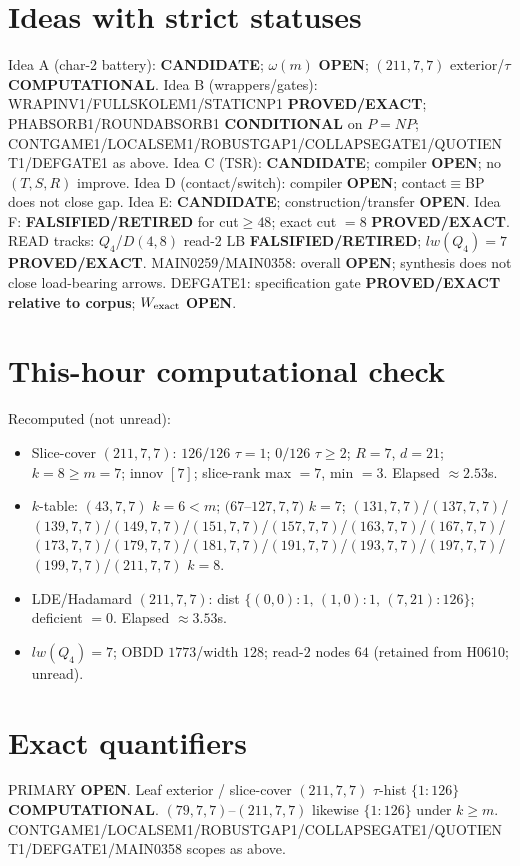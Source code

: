 \documentclass[11pt]{article}
\begin{document}
\section*{Ideas with strict statuses}
Idea A (char-2 battery): \textbf{CANDIDATE}; $\omega(m)$ \textbf{OPEN}; $(211,7,7)$ exterior/$\tau$ \textbf{COMPUTATIONAL}.
Idea B (wrappers/gates): WRAPINV1/FULLSKOLEM1/STATICNP1 \textbf{PROVED/EXACT};
PHABSORB1/ROUNDABSORB1 \textbf{CONDITIONAL} on $P=NP$;
CONTGAME1/LOCALSEM1/ROBUSTGAP1/COLLAPSEGATE1/QUOTIENT1/DEFGATE1 as above.
Idea C (TSR): \textbf{CANDIDATE}; compiler \textbf{OPEN}; no $(T,S,R)$ improve.
Idea D (contact/switch): compiler \textbf{OPEN}; contact$\equiv$BP does not close gap.
Idea E: \textbf{CANDIDATE}; construction/transfer \textbf{OPEN}.
Idea F: \textbf{FALSIFIED/RETIRED} for cut$\ge48$; exact cut $=8$ \textbf{PROVED/EXACT}.
READ tracks: $Q_4$/$D(4,8)$ read-$2$ LB \textbf{FALSIFIED/RETIRED}; $lw(Q_4)=7$ \textbf{PROVED/EXACT}.
MAIN0259/MAIN0358: overall \textbf{OPEN}; synthesis does not close load-bearing arrows.
DEFGATE1: specification gate \textbf{PROVED/EXACT relative to corpus}; $W_{\rm exact}$ \textbf{OPEN}.

\section*{This-hour computational check}
Recomputed (not unread):
\begin{itemize}
\item Slice-cover $(211,7,7)$: $126/126$ $\tau{=}1$; $0/126$ $\tau{\ge}2$; $R{=}7$, $d{=}21$;
  $k{=}8{\ge}m{=}7$; innov $[7]$; slice-rank max $=7$, min $=3$. Elapsed $\approx2.53$s.
\item $k$-table: $(43,7,7)$ $k{=}6{<}m$; $(67$--$127,7,7)$ $k{=}7$;
  $(131,7,7)$/$(137,7,7)$/$(139,7,7)$/$(149,7,7)$/$(151,7,7)$/$(157,7,7)$/$(163,7,7)$/$(167,7,7)$/$(173,7,7)$/$(179,7,7)$/$(181,7,7)$/$(191,7,7)$/$(193,7,7)$/$(197,7,7)$/$(199,7,7)$/$(211,7,7)$ $k{=}8$.
\item LDE/Hadamard $(211,7,7)$: dist $\{(0,0){:}1,\,(1,0){:}1,\,(7,21){:}126\}$; deficient $=0$. Elapsed $\approx3.53$s.
\item $lw(Q_4)=7$; OBDD $1773$/width $128$; read-$2$ nodes $64$ (retained from H0610; unread).
\end{itemize}

\section*{Exact quantifiers}
PRIMARY \textbf{OPEN}. Leaf exterior / slice-cover $(211,7,7)$ $\tau$-hist $\{1{:}126\}$ \textbf{COMPUTATIONAL}.
$(79,7,7)$--$(211,7,7)$ likewise $\{1{:}126\}$ under $k{\ge}m$. CONTGAME1/LOCALSEM1/ROBUSTGAP1/COLLAPSEGATE1/QUOTIENT1/DEFGATE1/MAIN0358 scopes as above.
\end{document}

